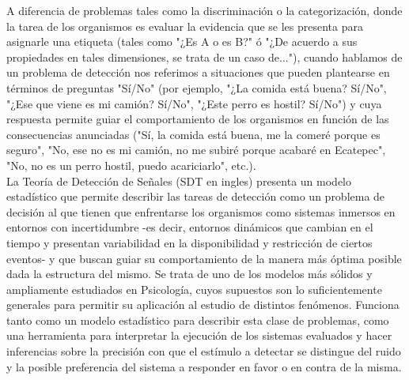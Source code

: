 A diferencia de problemas tales como la discriminación o la categorización, donde la tarea de los organismos es evaluar la evidencia que se les presenta para asignarle una etiqueta (tales como "¿Es A o es B?" ó "¿De acuerdo a sus propiedades en tales dimensiones, se trata de un caso de..."), cuando hablamos de un problema de detección nos referimos a situaciones que pueden plantearse en términos de preguntas "Sí/No" (por ejemplo, "¿La comida está buena? Sí/No", "¿Ese que viene es mi camión? Sí/No", "¿Este perro es hostil? Sí/No") y cuya respuesta permite guiar el comportamiento de los organismos en función de las consecuencias anunciadas ("Sí, la comida está buena, me la comeré porque es seguro", "No, ese no es mi camión, no me subiré porque acabaré en Ecatepec", "No, no es un perro hostil, puedo acariciarlo", etc.).\\ 

La Teoría de Detección de Señales (SDT en ingles) presenta un modelo estadístico que permite describir las tareas de detección como un problema de decisión al que tienen que enfrentarse los organismos como sistemas inmersos en entornos con incertidumbre -es decir, entornos dinámicos que cambian en el tiempo y presentan variabilidad en la disponibilidad y restricción de ciertos eventos- y que buscan guiar su comportamiento de la manera más óptima posible dada la estructura del mismo. Se trata de uno de los modelos más sólidos y ampliamente estudiados en Psicología, cuyos supuestos son lo suficientemente generales para permitir su aplicación al estudio de distintos fenómenos. Funciona tanto como un modelo estadístico para describir esta clase de problemas, como una herramienta para interpretar la ejecución de los sistemas evaluados y hacer inferencias sobre la precisión con que el estímulo a detectar se distingue del ruido y la posible preferencia del sistema a responder en favor o en contra de la misma.\\

